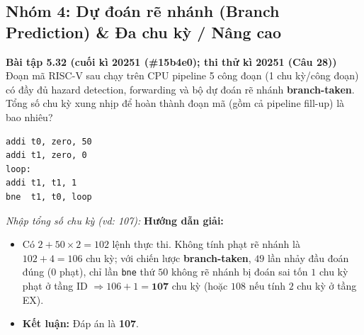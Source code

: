 \subsection{Nhóm 4: Dự đoán rẽ nhánh (Branch Prediction) \& Đa chu kỳ / Nâng cao}

\textbf{Bài tập 5.32 (cuối kì 20251 (\#15b4e0); thi thử kì 20251 (Câu 28))}\\
Đoạn mã RISC-V sau chạy trên CPU pipeline 5 công đoạn (1 chu kỳ/công đoạn) có đầy đủ hazard detection, forwarding và bộ dự đoán rẽ nhánh \textbf{branch-taken}. Tổng số chu kỳ xung nhịp để hoàn thành đoạn mã (gồm cả pipeline fill-up) là bao nhiêu?
\begin{lstlisting}
addi t0, zero, 50
addi t1, zero, 0
loop:
addi t1, t1, 1
bne  t1, t0, loop
\end{lstlisting}
\textit{Nhập tổng số chu kỳ (vd: 107):}
\textbf{Hướng dẫn giải:}
\begin{itemize}
    \item Có $2 + 50 \times 2 = 102$ lệnh thực thi. Không tính phạt rẽ nhánh là $102 + 4 = 106$ chu kỳ; với chiến lược \textbf{branch-taken}, $49$ lần nhảy đầu đoán đúng ($0$ phạt), chỉ lần \texttt{bne} thứ $50$ không rẽ nhánh bị đoán sai tốn $1$ chu kỳ phạt ở tầng ID $\Rightarrow 106 + 1 = \mathbf{107}$ chu kỳ (hoặc $108$ nếu tính $2$ chu kỳ ở tầng EX).
    \item \textbf{Kết luận:} Đáp án là \textbf{107}.
\end{itemize}

